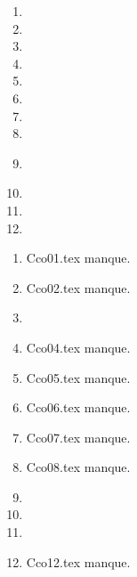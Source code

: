  
 
\begin{enumerate}
  \item 
  \item 
  \item 
  \item 
  \item 
  \item 
  \item 
  \item 
  \item 
\ \item 
  \item  
  \item  
\end{enumerate}
\clearpage 
{}
\begin{enumerate}
  \item Cco01.tex manque.
  \item Cco02.tex manque.
  \item 
  \item Cco04.tex manque.
  \item Cco05.tex manque.
  \item Cco06.tex manque.
  \item Cco07.tex manque.
  \item Cco08.tex manque.
  \item 
  \item 
  \item  
  \item Cco12.tex manque. 
\end{enumerate} 

